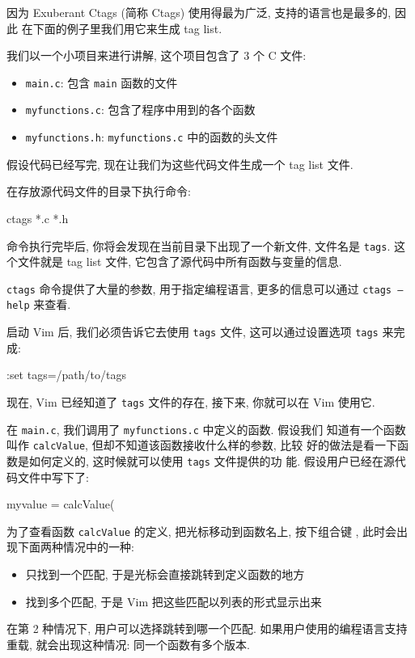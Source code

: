 因为 Exuberant Ctags (简称 Ctags) 使用得最为广泛, 支持的语言也是最多的, 因此 
在下面的例子里我们用它来生成 tag list.

我们以一个小项目来进行讲解, 这个项目包含了 3 个 C 文件:
\begin{itemize}
    \item \texttt{main.c}: 包含 \texttt{main} 函数的文件
    \item \texttt{myfunctions.c}: 包含了程序中用到的各个函数
    \item \texttt{myfunctions.h}: \texttt{myfunctions.c} 中的函数的头文件
\end{itemize}
假设代码已经写完, 现在让我们为这些代码文件生成一个 tag list 文件.

在存放源代码文件的目录下执行命令:
\begin{vimcode}
ctags *.c *.h
\end{vimcode}
命令执行完毕后, 你将会发现在当前目录下出现了一个新文件, 文件名是 \texttt{tags}.
这个文件就是 tag list 文件, 它包含了源代码中所有函数与变量的信息.
\begin{warning}
    \texttt{ctags} 命令提供了大量的参数, 用于指定编程语言, 更多的信息可以通过
    \texttt{ctags --help} 来查看.
\end{warning}
启动 Vim 后, 我们必须告诉它去使用 \texttt{tags} 文件, 这可以通过设置选项
\texttt{tags} 来完成:
\begin{vimcode}
:set tags=/path/to/tags
\end{vimcode}
现在, Vim 已经知道了 \texttt{tags} 文件的存在, 接下来, 你就可以在 Vim  使用它.

在 \texttt{main.c}, 我们调用了 \texttt{myfunctions.c} 中定义的函数. 假设我们 
知道有一个函数叫作 \texttt{calcValue}, 但却不知道该函数接收什么样的参数, 比较 
好的做法是看一下函数是如何定义的, 这时候就可以使用 \texttt{tags} 文件提供的功
能. 假设用户已经在源代码文件中写下了:
\begin{vimcode}
myvalue = calcValue(
\end{vimcode}
为了查看函数 \texttt{calcValue} 的定义, 把光标移动到函数名上, 按下组合键
\key{Ctrl+]}, 此时会出现下面两种情况中的一种:
\begin{itemize}
    \item 只找到一个匹配, 于是光标会直接跳转到定义函数的地方
    \item 找到多个匹配, 于是 Vim 把这些匹配以列表的形式显示出来
\end{itemize}
在第 2 种情况下, 用户可以选择跳转到哪一个匹配. 如果用户使用的编程语言支持重载,
就会出现这种情况: 同一个函数有多个版本.

